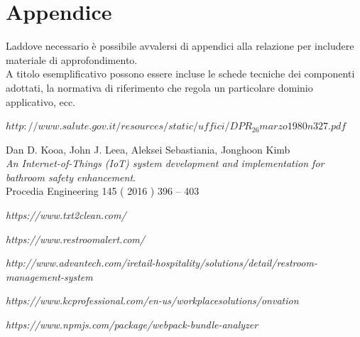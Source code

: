 \documentclass[12pt]{article}
\begin{document}

\appendix
{}
\section*{Appendice}
Laddove necessario è possibile avvalersi di appendici alla relazione per includere materiale di approfondimento.\\

A titolo esemplificativo possono essere incluse le schede tecniche dei componenti adottati, la normativa di riferimento che regola un particolare dominio applicativo, ecc.


\newpage


\begin{thebibliography}{9}
\textit{$http://www.salute.gov.it/resources/static/uffici/DPR_26marzo1980n327.pdf$}

Dan D. Kooa, John J. Leea, Aleksei Sebastiania, Jonghoon Kimb \\
\textit{An Internet-of-Things (IoT) system development and
implementation for bathroom safety enhancement}.\\
Procedia Engineering 145 ( 2016 ) 396 – 403 

\textit{https://www.txt2clean.com/}

\textit{https://www.restroomalert.com/}

\textit{http://www.advantech.com/iretail-hospitality/solutions/detail/restroom-management-system}

\textit{https://www.kcprofessional.com/en-us/workplacesolutions/onvation}

\textit{https://www.npmjs.com/package/webpack-bundle-analyzer}

\end{thebibliography}

\end{document}
